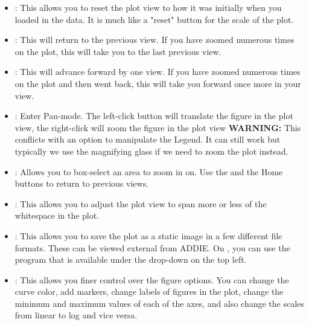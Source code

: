\begin{itemize}

\item {}: This allows you to reset the plot view to how it was initially when you loaded in the data. It is much like a "reset" button for the scale of the plot.

\item {}: This will return to the previous view. If you have zoomed numerous times on the plot, this will take you to the last previous view.

\item {}: This will advance forward by one view. If you have zoomed numerous times on the plot and then went back, this will take you forward once more in your view.

\item {}: Enter Pan-mode. The left-click button will translate the figure in the plot view, the right-click will zoom the figure in the plot view \textbf{WARNING:} This conflicts with an option to manipulate the Legend. It can still work but typically we use the magnifying glass if we need to zoom the plot instead.

\item {}: Allows you to box-select an area to zoom in on. Use the  and the {Home} buttons to return to previous views.

\item {}: This allows you to adjust the plot view to span more or less of the whitespace in the plot.

\item {}: This allows you to save the plot as a static image in a few different file formats. These can be viewed external from ADDIE. On \analysis, you can use the  program that is available under the  drop-down on the top left.

\item {}: This allows you finer control over the figure options. You can change the curve color, add markers, change labels of figures in the plot, change the minimum and maximum values of each of the axes, and also change the scales from linear to log and vice versa. 

\end{itemize}